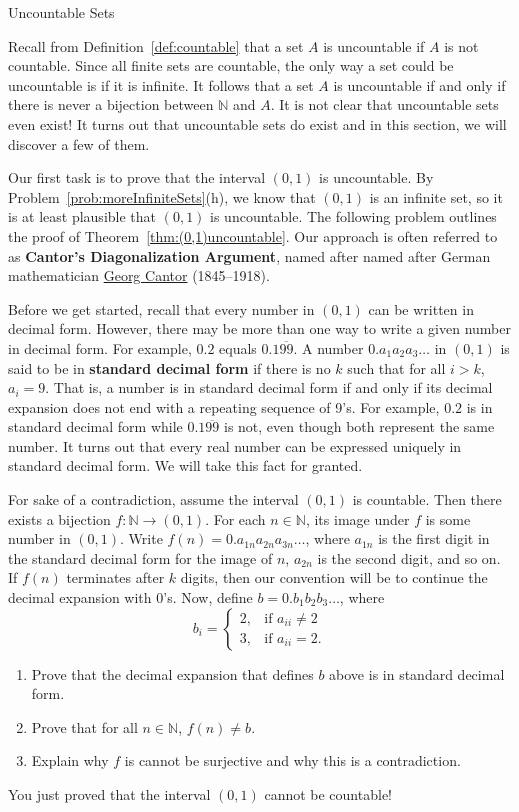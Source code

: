 \begin{section}{Uncountable Sets}

Recall from Definition~\ref{def:countable} that a set $A$ is uncountable if $A$ is not countable.  Since all finite sets are countable, the only way a set could be uncountable is if it is infinite.  It follows that a set $A$ is uncountable if and only if there is never a bijection between $\mathbb{N}$ and $A$.  It is not clear that uncountable sets even exist!  It turns out that uncountable sets do exist and in this section, we will discover a few of them.

Our first task is to prove that the interval $(0,1)$ is uncountable.  By Problem~\ref{prob:moreInfiniteSets}(h), we know that $(0,1)$ is an infinite set, so it is at least plausible that $(0,1)$ is uncountable.  The following problem outlines the proof of Theorem~\ref{thm:(0,1)uncountable}.  Our approach is often referred to as \textbf{Cantor's Diagonalization Argument}, named after named after German mathematician \href{https://en.wikipedia.org/wiki/Georg_Cantor}{Georg Cantor} (1845--1918).

Before we get started, recall that every number in $(0,1)$ can be written in decimal form. However, there may be more than one way to write a given number in decimal form.  For example, $0.2$ equals $0.1\overline{99}$.  A number $0.a_1a_2a_3\ldots$ in $(0,1)$ is said to be in \textbf{standard decimal form} if there is no $k$ such that for all $i>k$, $a_i=9$. That is, a number is in standard decimal form if and only if its decimal expansion does not end with a repeating sequence of 9's. For example, $0.2$ is in standard decimal form while $0.1\overline{99}$ is not, even though both represent the same number. It turns out that every real number can be expressed uniquely in standard decimal form. We will take this fact for granted.

\begin{problem}
For sake of a contradiction, assume the interval $(0,1)$ is countable.  Then there exists a bijection $f:\mathbb{N}\to (0,1)$. For each $n\in\mathbb{N}$, its image under $f$ is some number in $(0,1)$.  Write $f(n)=0.a_{1n}a_{2n}a_{3n}\ldots$, where $a_{1n}$ is the first digit in the standard decimal form for the image of $n$, $a_{2n}$ is the second digit, and so on. If $f(n)$ terminates after $k$ digits, then our convention will be to continue the decimal expansion with 0's. Now, define $b=0.b_1b_2b_3\ldots$, where
\[
b_i=\begin{cases}
2, & \text{if }a_{ii}\neq 2\\
3, & \text{if }a_{ii}=2.
\end{cases}
\]
\begin{enumerate}[label=\textrm{(\alph*)}]
\item Prove that the decimal expansion that defines $b$ above is in standard decimal form.
\item Prove that for all $n\in\mathbb{N}$, $f(n)\neq b$.
\item Explain why $f$ is cannot be surjective and why this is a contradiction.
\end{enumerate}
You just proved that the interval $(0,1)$ cannot be countable!
\end{problem}


\end{section}
